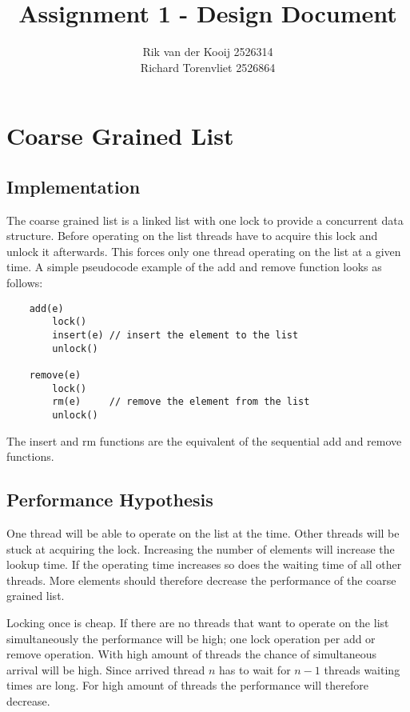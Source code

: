 \documentclass[10pt,a4paper]{article}
\author{Rik van der Kooij 2526314\\Richard Torenvliet 2526864}
\title{Assignment 1 - Design Document}
\begin{document}
\maketitle



\section{Coarse Grained List}
\subsection{Implementation}
    The coarse grained list is a linked list with one lock to provide a
    concurrent data structure. Before operating on the list threads have to
    acquire this lock and unlock it afterwards. This forces only one thread
    operating on the list at a given time. A simple pseudocode example of the
    add and remove function looks as follows:

\begin{lstlisting}
    add(e) 
        lock()
        insert(e) // insert the element to the list
        unlock()

    remove(e)
        lock()
        rm(e)     // remove the element from the list
        unlock()
\end{lstlisting}

The insert and rm functions are the equivalent of the sequential add and remove
functions.

\subsection{Performance Hypothesis}
One thread will be able to operate on the list at the time. Other threads will
be stuck at acquiring the lock. Increasing the number of elements will increase
the lookup time. If the operating time increases so does the waiting time of
all other threads. More elements should therefore decrease the performance of
the coarse grained list.

Locking once is cheap. If there are no threads that want to operate on the list
simultaneously the performance will be high; one lock operation per add or
remove operation.  With high amount of threads the chance of simultaneous
arrival will be high. Since arrived thread $n$ has to wait for $n-1$ threads
waiting times are long. For high amount of threads the performance will
therefore decrease. 
\end{document}
